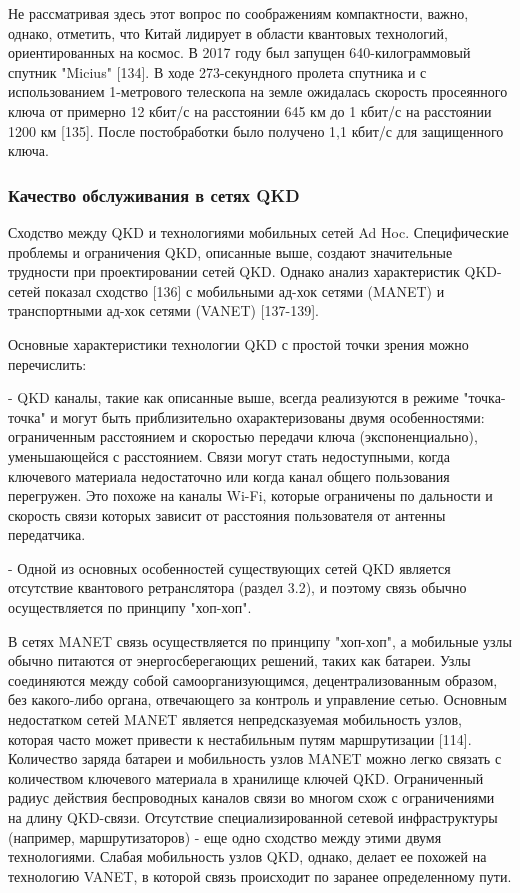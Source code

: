 Не рассматривая здесь этот вопрос по соображениям компактности, важно, однако, отметить, что Китай лидирует в области квантовых технологий, ориентированных на космос. В 2017 году был запущен 640-килограммовый спутник "Micius" [134]. В ходе 273-секундного пролета спутника и с использованием 1-метрового телескопа на земле ожидалась скорость просеянного ключа от примерно 12 кбит/с на расстоянии 645 км до 1 кбит/с на расстоянии 1200 км [135]. После постобработки было получено 1,1 кбит/с для защищенного ключа.

\subsubsection{Качество обслуживания в сетях QKD}

Сходство между QKD и технологиями мобильных сетей Ad Hoc. Специфические проблемы и ограничения QKD, описанные выше, создают значительные трудности при проектировании сетей QKD. Однако анализ характеристик QKD-сетей показал сходство [136] с мобильными ад-хок сетями (MANET) и транспортными ад-хок сетями (VANET) [137-139].

Основные характеристики технологии QKD с простой точки зрения можно перечислить:

- QKD каналы, такие как описанные выше, всегда реализуются в режиме "точка-точка" и могут быть приблизительно охарактеризованы двумя особенностями: ограниченным расстоянием и скоростью передачи ключа (экспоненциально), уменьшающейся с расстоянием. Связи могут стать недоступными, когда ключевого материала недостаточно или когда канал общего пользования перегружен. Это похоже на каналы Wi-Fi, которые ограничены по дальности и скорость связи которых зависит от расстояния пользователя от антенны передатчика.

- Одной из основных особенностей существующих сетей QKD является отсутствие квантового ретранслятора (раздел 3.2), и поэтому связь обычно осуществляется по принципу "хоп-хоп".

В сетях MANET связь осуществляется по принципу "хоп-хоп", а мобильные узлы обычно питаются от энергосберегающих решений, таких как батареи. Узлы соединяются между собой самоорганизующимся, децентрализованным образом, без какого-либо органа, отвечающего за контроль и управление сетью. Основным недостатком сетей MANET является непредсказуемая мобильность узлов, которая часто может привести к нестабильным путям маршрутизации [114]. Количество заряда батареи и мобильность узлов MANET можно легко связать с количеством ключевого материала в хранилище ключей QKD. Ограниченный радиус действия беспроводных каналов связи во многом схож с ограничениями на длину QKD-связи. Отсутствие специализированной сетевой инфраструктуры (например, маршрутизаторов) - еще одно сходство между этими двумя технологиями. Слабая мобильность узлов QKD, однако, делает ее похожей на технологию VANET, в которой связь происходит по заранее определенному пути.

